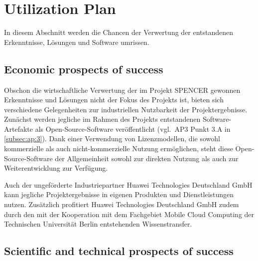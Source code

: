 \clearpage
\section{Utilization Plan}
\label{sec:verwertungsplan}

In diesem Abschnitt werden die Chancen der Verwertung der entstandenen Erkenntnisse, Lösungen und Software umrissen.

\subsection{Economic prospects of success}
\label{sec:verwertungsplan:wirtschaft}


Obschon die wirtschaftliche Verwertung der im Projekt SPENCER gewonnen Erkenntnisse und Lö\-sung\-en nicht der Fokus des Projekts ist, bieten sich verschiedene Gelegenheiten zur industriellen Nutzbarkeit der Projektergebnisse.
Zunächst werden jegliche im Rahmen des Projekts entstandenen Software-Artefakte als Open-Source-Software veröffentlicht (vgl.~AP3 Punkt 3.A in \cref{subsec:ap:3}).
Dank einer Verwendung von Lizenzmodellen, die sowohl kommerzielle als auch nicht-kommerzielle Nutzung ermöglichen, steht diese Open-Source-Software der Allgemeinheit sowohl zur direkten Nutzung als auch zur Weiterentwicklung zur Verfügung.

Auch der ungeförderte Industriepartner Huawei Technologies Deutschland GmbH kann jegliche Projektergebnisse in eigenen Produkten und Dienstleistungen nutzen.
Zusätzlich profitiert Huawei Technologies Deutschland GmbH zudem durch den mit der Kooperation mit dem Fachgebiet Mobile Cloud Computing der Technischen Universität Berlin entstehenden Wissenstransfer.

\subsection{Scientific and technical prospects of success}
\label{sec:verwertungsplan:wissenschaft}


